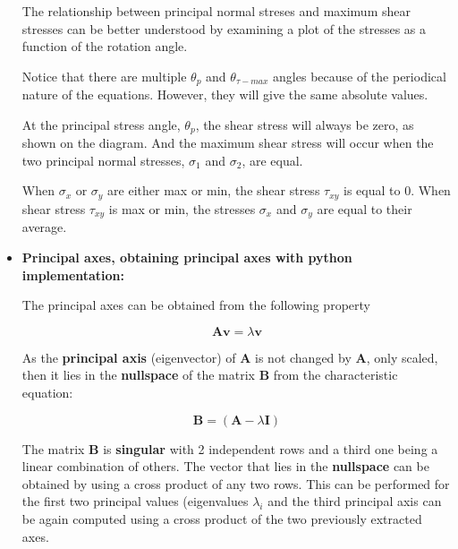 \begin{itemize}
        The relationship between principal normal streses and maximum shear stresses
        can be better understood by examining a plot of the stresses as a function
        of the rotation angle.

        Notice that there are multiple $\theta_{p}$ and $\theta_{\tau - max}$
        angles because of the periodical nature of the equations. However, they
        will give the same absolute values.

        At the principal stress angle, $\theta_{p}$, the shear stress will always be zero,
        as shown on the diagram. And the maximum shear stress will occur when the
        two principal normal stresses, $\sigma_1$ and $\sigma_2$, are equal.

        \begin{bbox}[0.85]
            When $\sigma_{x}$ or $\sigma_{y}$ are either max or min, the shear stress
            $\tau_{xy}$ is equal to 0. When shear stress $\tau_{xy}$ is max or min,
            the stresses $\sigma_{x}$ and $\sigma_{y}$ are equal to their average.
        \end{bbox}


    \item \textbf{Principal axes, obtaining principal axes with python implementation:}

        The principal axes can be obtained from the following property

        \begin{equation}
            \mathbf{A}\mathbf{v} = \lambda \mathbf{v}
        \end{equation}

        As the \textbf{principal axis} (eigenvector) of $ \mathbf{A} $ is not changed
        by $ \mathbf{A} $, only scaled, then it lies in the \textbf{nullspace} of the
        matrix $ \mathbf{B} $ from the characteristic equation:

        \begin{equation}
            \mathbf{B} = (\mathbf{A} - \lambda \mathbf{I})
        \end{equation}

        The matrix $ \mathbf{B} $ is \textbf{singular} with 2 independent rows and
        a third one being a linear combination of others. The vector that lies
        in the \textbf{nullspace} can be obtained by using a cross product of any
        two rows. This can be performed for the first two principal values
        (eigenvalues $ \lambda_i $ and the third principal axis can be again
        computed using a cross product of the two previously extracted axes.


\end{itemize}
